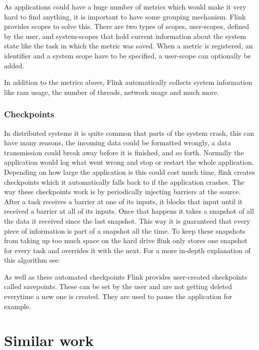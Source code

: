 As applications could have a huge number of metrics which would make it very hard to find anything, it is important to have some grouping mechanism. Flink provides scopes to solve this. There are two types of scopes, user-scopes, defined by the user, and system-scopes that hold current information about the system state like the task in which the metric was saved. When a metric is registered, an identifier and a system scope have to be specified, a user-scope can optionally be added.

In addition to the metrics above, Flink automatically collects system information like ram usage, the number of threads, network usage and much more.

\subsubsection{Checkpoints}
\label{checkpoints}

In distributed systems it is quite common that parts of the system crash, this can have many reasons, the incoming data could be formatted wrongly, a data transmission could break away before it is finished, and so forth. Normally the application would log what went wrong and stop or restart the whole application. Depending on how large the application is this could cost much time, flink creates checkpoints which it automatically falls back to if the application crashes. The way these checkpoints work is by periodically injecting barriers at the source. After a task receives a barrier at one of its inputs, it blocks that input until it received a barrier at all of its inputs. Once that happens it takes a snapshot of all the data it received since the last snapshot. This way it is guaranteed that every piece of information is part of a snapshot all the time. To keep these snapshots from taking up too much space on the hard drive flink only stores one snapshot for every task and overrides it with the next. For a more in-depth explanation of this algorithm see: \cite{DBLP:journals/corr/CarboneFEHT15}

As well as these automated checkpoints Flink provides user-created checkpoints called savepoints. These can be set by the user and are not getting deleted everytime a new one is created. They are used to pause the application for example.


\section{Similar work}
\label{similarWork}

